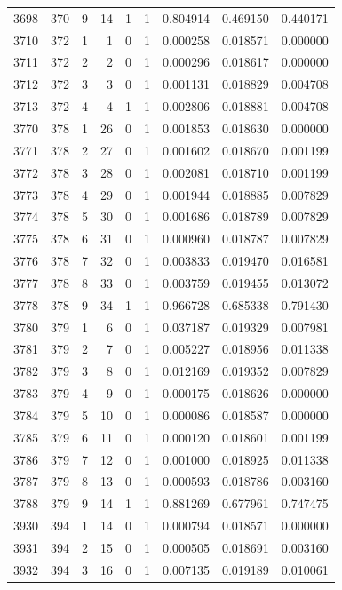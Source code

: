 \begin{longtable}{rrrrrrrrr}
3698 & 370 & 9 & 14 & 1 & 1 & 0.804914 & 0.469150 & 0.440171 \\
3710 & 372 & 1 & 1 & 0 & 1 & 0.000258 & 0.018571 & 0.000000 \\
3711 & 372 & 2 & 2 & 0 & 1 & 0.000296 & 0.018617 & 0.000000 \\
3712 & 372 & 3 & 3 & 0 & 1 & 0.001131 & 0.018829 & 0.004708 \\
3713 & 372 & 4 & 4 & 1 & 1 & 0.002806 & 0.018881 & 0.004708 \\
3770 & 378 & 1 & 26 & 0 & 1 & 0.001853 & 0.018630 & 0.000000 \\
3771 & 378 & 2 & 27 & 0 & 1 & 0.001602 & 0.018670 & 0.001199 \\
3772 & 378 & 3 & 28 & 0 & 1 & 0.002081 & 0.018710 & 0.001199 \\
3773 & 378 & 4 & 29 & 0 & 1 & 0.001944 & 0.018885 & 0.007829 \\
3774 & 378 & 5 & 30 & 0 & 1 & 0.001686 & 0.018789 & 0.007829 \\
3775 & 378 & 6 & 31 & 0 & 1 & 0.000960 & 0.018787 & 0.007829 \\
3776 & 378 & 7 & 32 & 0 & 1 & 0.003833 & 0.019470 & 0.016581 \\
3777 & 378 & 8 & 33 & 0 & 1 & 0.003759 & 0.019455 & 0.013072 \\
3778 & 378 & 9 & 34 & 1 & 1 & 0.966728 & 0.685338 & 0.791430 \\
3780 & 379 & 1 & 6 & 0 & 1 & 0.037187 & 0.019329 & 0.007981 \\
3781 & 379 & 2 & 7 & 0 & 1 & 0.005227 & 0.018956 & 0.011338 \\
3782 & 379 & 3 & 8 & 0 & 1 & 0.012169 & 0.019352 & 0.007829 \\
3783 & 379 & 4 & 9 & 0 & 1 & 0.000175 & 0.018626 & 0.000000 \\
3784 & 379 & 5 & 10 & 0 & 1 & 0.000086 & 0.018587 & 0.000000 \\
3785 & 379 & 6 & 11 & 0 & 1 & 0.000120 & 0.018601 & 0.001199 \\
3786 & 379 & 7 & 12 & 0 & 1 & 0.001000 & 0.018925 & 0.011338 \\
3787 & 379 & 8 & 13 & 0 & 1 & 0.000593 & 0.018786 & 0.003160 \\
3788 & 379 & 9 & 14 & 1 & 1 & 0.881269 & 0.677961 & 0.747475 \\
3930 & 394 & 1 & 14 & 0 & 1 & 0.000794 & 0.018571 & 0.000000 \\
3931 & 394 & 2 & 15 & 0 & 1 & 0.000505 & 0.018691 & 0.003160 \\
3932 & 394 & 3 & 16 & 0 & 1 & 0.007135 & 0.019189 & 0.010061 \\

\end{longtable}
